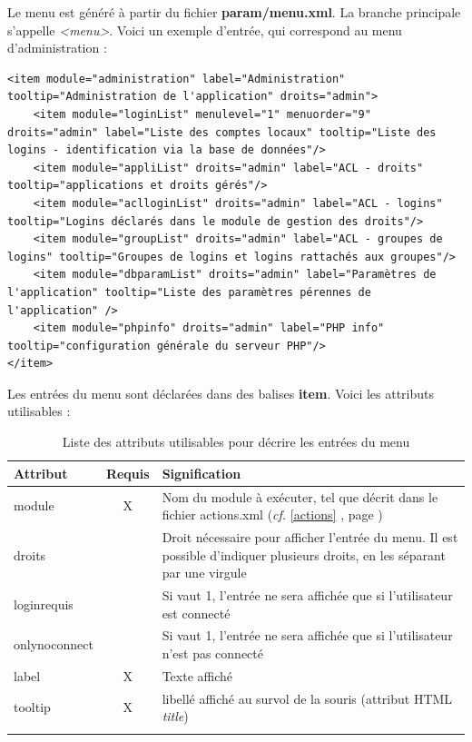 Le menu est généré à partir du fichier \textbf{param/menu.xml}. La branche principale s'appelle \textit{<menu>}. Voici un exemple d'entrée, qui correspond au menu d'administration :

\begin{lstlisting}
<item module="administration" label="Administration" tooltip="Administration de l'application" droits="admin">
	<item module="loginList" menulevel="1" menuorder="9" droits="admin" label="Liste des comptes locaux" tooltip="Liste des logins - identification via la base de données"/>
	<item module="appliList" droits="admin" label="ACL - droits" tooltip="applications et droits gérés"/>
	<item module="aclloginList" droits="admin" label="ACL - logins" tooltip="Logins déclarés dans le module de gestion des droits"/>
	<item module="groupList" droits="admin" label="ACL - groupes de logins" tooltip="Groupes de logins et logins rattachés aux groupes"/>
	<item module="dbparamList" droits="admin" label="Paramètres de l'application" tooltip="Liste des paramètres pérennes de l'application" />
	<item module="phpinfo" droits="admin" label="PHP info" tooltip="configuration générale du serveur PHP"/>
</item>
\end{lstlisting}

Les entrées du menu sont déclarées dans des balises \textbf{item}. Voici les attributs utilisables :

\begin{longtable}{|p{2.5cm}|c|p{9cm}|}
\hline
\textbf{Attribut} & \textbf{Requis} & \textbf{Signification} \\
\hline
\endhead
\hline\endfoot\endlastfoot
module & X & Nom du module à exécuter, tel que décrit dans le fichier actions.xml (\textit{cf.} \ref{actions} \textit{\nameref{actions}}, page \pageref{actions})\\

droits & & Droit nécessaire pour afficher l'entrée du menu. Il est possible d'indiquer plusieurs droits, en les séparant par une virgule\\

loginrequis & & Si vaut 1, l'entrée ne sera affichée que si l'utilisateur est connecté \\

onlynoconnect & & Si vaut 1, l'entrée ne sera affichée que si l'utilisateur n'est pas connecté\\

label & X & Texte affiché\\

tooltip & X & libellé affiché au survol de la souris (attribut HTML \textit{title})\\
 \hline

\caption{Liste des attributs utilisables pour décrire les entrées du menu}
\end{longtable}

